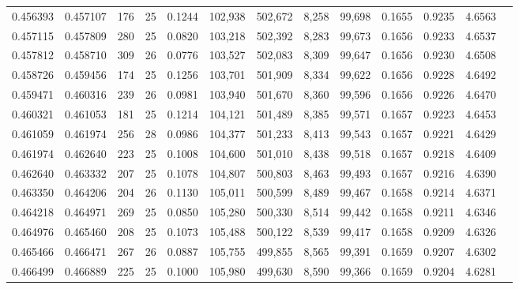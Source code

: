 \begin{tabular}{rrrrrrrrrrrrr}
0.456393 & 0.457107 &   176 &  25 &                                     0.1244 & 102,938 & 502,672 &   8,258 &  99,698 & 0.1655 & 0.9235 & 4.6563 \\
0.457115 & 0.457809 &   280 &  25 &                                     0.0820 & 103,218 & 502,392 &   8,283 &  99,673 & 0.1656 & 0.9233 & 4.6537 \\
0.457812 & 0.458710 &   309 &  26 &                                     0.0776 & 103,527 & 502,083 &   8,309 &  99,647 & 0.1656 & 0.9230 & 4.6508 \\
0.458726 & 0.459456 &   174 &  25 &                                     0.1256 & 103,701 & 501,909 &   8,334 &  99,622 & 0.1656 & 0.9228 & 4.6492 \\
0.459471 & 0.460316 &   239 &  26 &                                     0.0981 & 103,940 & 501,670 &   8,360 &  99,596 & 0.1656 & 0.9226 & 4.6470 \\
0.460321 & 0.461053 &   181 &  25 &                                     0.1214 & 104,121 & 501,489 &   8,385 &  99,571 & 0.1657 & 0.9223 & 4.6453 \\
0.461059 & 0.461974 &   256 &  28 &                                     0.0986 & 104,377 & 501,233 &   8,413 &  99,543 & 0.1657 & 0.9221 & 4.6429 \\
0.461974 & 0.462640 &   223 &  25 &                                     0.1008 & 104,600 & 501,010 &   8,438 &  99,518 & 0.1657 & 0.9218 & 4.6409 \\
0.462640 & 0.463332 &   207 &  25 &                                     0.1078 & 104,807 & 500,803 &   8,463 &  99,493 & 0.1657 & 0.9216 & 4.6390 \\
0.463350 & 0.464206 &   204 &  26 &                                     0.1130 & 105,011 & 500,599 &   8,489 &  99,467 & 0.1658 & 0.9214 & 4.6371 \\
0.464218 & 0.464971 &   269 &  25 &                                     0.0850 & 105,280 & 500,330 &   8,514 &  99,442 & 0.1658 & 0.9211 & 4.6346 \\
0.464976 & 0.465460 &   208 &  25 &                                     0.1073 & 105,488 & 500,122 &   8,539 &  99,417 & 0.1658 & 0.9209 & 4.6326 \\
0.465466 & 0.466471 &   267 &  26 &                                     0.0887 & 105,755 & 499,855 &   8,565 &  99,391 & 0.1659 & 0.9207 & 4.6302 \\
0.466499 & 0.466889 &   225 &  25 &                                     0.1000 & 105,980 & 499,630 &   8,590 &  99,366 & 0.1659 & 0.9204 & 4.6281 \\

\end{tabular}

